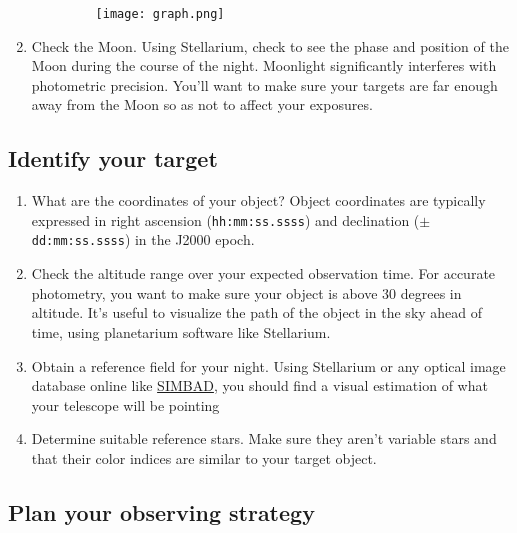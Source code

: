 \documentclass{article}
\begin{document}
\begin{enumerate}
\begin{enumerate}
			\begin{figure}[h]
				\centering
				\texttt{[image: graph.png]}
			\end{figure}
			
		\end{enumerate}
		
		\item Check the Moon. Using Stellarium, check to see the phase and position of the Moon during the course of the night. Moonlight significantly interferes with photometric precision. You'll want to make sure your targets are far enough away from the Moon so as not to affect your exposures.
		
	\end{enumerate}
	
	\subsection{Identify your target}
	
	\begin{enumerate}
		
		\item What are the coordinates of your object? Object coordinates are typically expressed in right ascension (\texttt{hh:mm:ss.ssss}) and declination (\texttt{$\pm$dd:mm:ss.ssss}) in the J2000 epoch.
		
		\item Check the altitude range over your expected observation time. For accurate photometry, you want to make sure your object is above 30 degrees in altitude. It's useful to visualize the path of the object in the sky ahead of time, using planetarium software like Stellarium.
		
		\item Obtain a reference field for your night. Using Stellarium or any optical image database online like \href{http://simbad.u-strasbg.fr/simbad/}{SIMBAD}, you should find a visual estimation of what your telescope will be pointing
		
		\item Determine suitable reference stars. Make sure they aren't variable stars and that their color indices are similar to your target object.
		
	\end{enumerate}
	
	\subsection{Plan your observing strategy}
	
\end{document}
